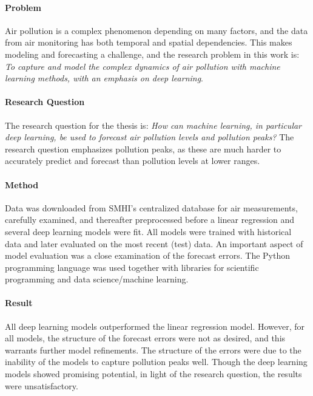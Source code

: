 \documentclass[12pt]{report}
\numberwithin{equation}{section}
\begin{document}
\paragraph{Problem}
Air pollution is a complex phenomenon depending on many factors, and the data from air monitoring has both temporal and spatial dependencies. This makes modeling and forecasting a challenge, and the research problem in this work is: \textit{To capture and model the complex dynamics of air pollution with machine learning methods, with an emphasis on deep learning}.

\paragraph{Research Question}
The research question for the thesis is: \textit{How can machine learning, in particular deep learning, be used to forecast air pollution levels and pollution peaks?} The research question emphasizes pollution peaks, as these are much harder to accurately predict and forecast than pollution levels at lower ranges.  %
%

\paragraph{Method}
Data was downloaded from SMHI's centralized database for air measurements, carefully examined, and thereafter preprocessed before a linear regression and several deep learning models were fit. All models were trained with historical data and later evaluated on the most recent (test) data. An important aspect of model evaluation was a close examination of the forecast errors. The Python programming language was used together with libraries for scientific programming and data science/machine learning.

\paragraph{Result}
All deep learning models outperformed the linear regression model. However, for all models, the structure of the forecast errors were not as desired, and this warrants further model refinements. The structure of the errors were due to the inability of the models to capture pollution peaks well. Though the deep learning models showed promising potential, in light of the research question, the results were unsatisfactory. 
\end{document}
